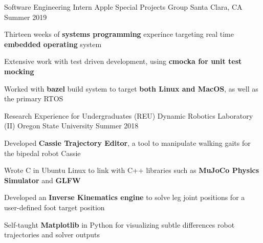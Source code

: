 

\begin{cventries}

  
  \cventry
    {Software Engineering Intern} %
    {Apple Special Projects Group} %
    {Santa Clara, CA} %
    {Summer 2019} %
    {
      \begin{cvitems} %
      \item {Thirteen weeks of \textbf{systems programming} experince targeting real time \textbf{embedded operating} system}
      \item {Extensive work with test driven development, using \textbf{cmocka for unit test mocking}}
      \item {Worked with \textbf{bazel} build system to target \textbf{both Linux and MacOS}, as well as the primary RTOS}
      \end{cvitems}
    }

  


  \cventry
    {Research Experience for Undergraduates (REU)} %
    {Dynamic Robotics Laboratory (II)} %
    {Oregon State University} %
    {Summer 2018} %
    {
      \begin{cvitems} %
        \item {Developed \textbf{Cassie Trajectory Editor}, a tool to manipulate walking gaits for the bipedal robot Cassie}
        \item {Wrote C in Ubuntu Linux to link with C++ libraries such as \textbf{MuJoCo Physics Simulator} and \textbf{GLFW}}
        \item {Developed an \textbf{Inverse Kinematics engine} to solve leg joint positions for a user-defined foot target position}
        \item {Self-taught \textbf{Matplotlib} in Python for visualizing subtle differences robot trajectories and solver outputs}
      \end{cvitems}
    }
  



\end{cventries}
